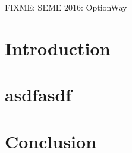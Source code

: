 \documentclass[a4paper,12pt]{article}
\newcommand{\thetitle}{FIXME: SEME 2016: OptionWay}
\begin{document}
\begin{center}
  \thetitle{}
\end{center}


\section{Introduction}


\section{asdfasdf}

\section{Conclusion}
\end{document}
